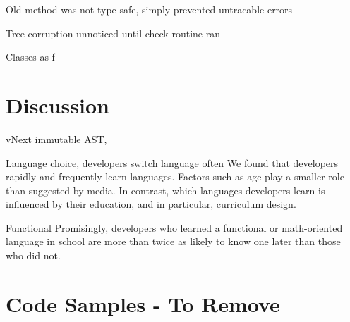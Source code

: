 \documentclass[twoside,openright]{uva-bachelor-thesis}
\newcommand{\includecode}[3]{}
\begin{document}
		Old method was not type safe, simply prevented untracable errors
		
		Tree corruption unnoticed until check routine ran
		
		Classes as f
	
\chapter{Discussion}
	vNext immutable AST, 
	
	Language choice, developers switch language often
		We found that developers rapidly and frequently learn
		languages. Factors such as age play a smaller role than suggested
		by media. In contrast, which languages developers
		learn is influenced by their education, and in particular, curriculum
		design.
		
	Functional
		Promisingly, developers who learned a functional or	math-oriented language in school are more than twice as likely to know one later than those who did not.
		
\chapter{Code Samples - To Remove}
	\includecode{c_node_union.c}{old-arch:union}{Sample child node and attribute union structures for node}
	\includecode{c_init_trav.c}{old-arch:start-trav}{Starting a traversal}
	\includecode{c_trav_sons.c}{old-arch:switch-trav}{Excerpt from catch-all switch construct}
	\includecode{ast1.cs}{reflection-base-simple}{Using reflection to retrieve marked properties from a derived class}
	\includecode{ast2.cs}{reflection-base}{Updated code for the base class and attribute}
	\includecode{walkabout.java}{walkabout}{Walkabout algorithm by \citeauthor{palsberg1998essence}}
	\includecode{viewonly.cs}{readonly}{View-only visitor}
	\includecode{gen_visitor.cs}{gen-visit}{Generalized visitor}
	\includecode{lambda_visitor.cs}{lambda}{Lambda-based visitor}	



\end{document}
